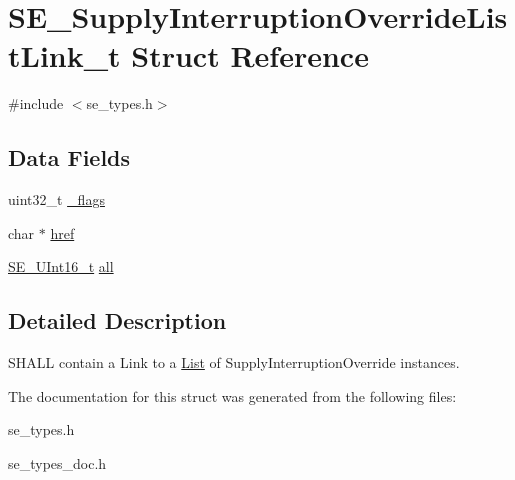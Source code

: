 \hypertarget{structSE__SupplyInterruptionOverrideListLink__t}{}\section{S\+E\+\_\+\+Supply\+Interruption\+Override\+List\+Link\+\_\+t Struct Reference}
\label{structSE__SupplyInterruptionOverrideListLink__t}


{\ttfamily \#include $<$se\+\_\+types.\+h$>$}

\subsection*{Data Fields}
\begin{DoxyCompactItemize}
\item 
uint32\+\_\+t \hyperlink{group__SupplyInterruptionOverrideListLink_ga783e5fcd44df840ad1e21c12f1e80b97}{\+\_\+flags}
\item 
char $\ast$ \hyperlink{group__SupplyInterruptionOverrideListLink_gafbb7661ea1af8a68f693a16f93f56a30}{href}
\item 
\hyperlink{group__UInt16_gac68d541f189538bfd30cfaa712d20d29}{S\+E\+\_\+\+U\+Int16\+\_\+t} \hyperlink{group__SupplyInterruptionOverrideListLink_gae549a06d4bf58047ec9444e7b35a1062}{all}
\end{DoxyCompactItemize}


\subsection{Detailed Description}
S\+H\+A\+LL contain a Link to a \hyperlink{structList}{List} of Supply\+Interruption\+Override instances. 

The documentation for this struct was generated from the following files\+:\begin{DoxyCompactItemize}
\item 
se\+\_\+types.\+h\item 
se\+\_\+types\+\_\+doc.\+h\end{DoxyCompactItemize}
